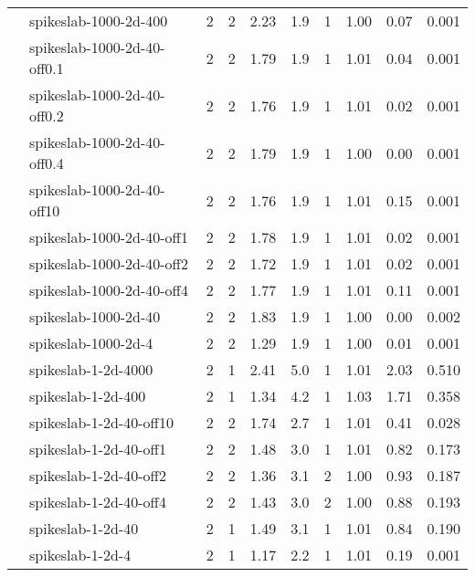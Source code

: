 \begin{tabular}{ll|rrcccccc}
                     & spikeslab-1000-2d-400 & 2   & 2    & 2.23 & 1.9 &    1 & 1.00 & 0.07 & 0.001 \\
                     & spikeslab-1000-2d-40-off0.1 & 2   & 2    & 1.79 & 1.9 &    1 & 1.01 & 0.04 & 0.001 \\
                     & spikeslab-1000-2d-40-off0.2 & 2   & 2    & 1.76 & 1.9 &    1 & 1.01 & 0.02 & 0.001 \\
                     & spikeslab-1000-2d-40-off0.4 & 2   & 2    & 1.79 & 1.9 &    1 & 1.00 & 0.00 & 0.001 \\
                     & spikeslab-1000-2d-40-off10 & 2   & 2    & 1.76 & 1.9 &    1 & 1.01 & 0.15 & 0.001 \\
                     & spikeslab-1000-2d-40-off1 & 2   & 2    & 1.78 & 1.9 &    1 & 1.01 & 0.02 & 0.001 \\
                     & spikeslab-1000-2d-40-off2 & 2   & 2    & 1.72 & 1.9 &    1 & 1.01 & 0.02 & 0.001 \\
                     & spikeslab-1000-2d-40-off4 & 2   & 2    & 1.77 & 1.9 &    1 & 1.01 & 0.11 & 0.001 \\
                     & spikeslab-1000-2d-40 & 2   & 2    & 1.83 & 1.9 &    1 & 1.00 & 0.00 & 0.002 \\
                     & spikeslab-1000-2d-4  & 2   & 2    & 1.29 & 1.9 &    1 & 1.00 & 0.01 & 0.001 \\
                     & spikeslab-1-2d-4000  & 2   & 1    & 2.41 & 5.0 &    1 & 1.01 & 2.03 & 0.510 \\
                     & spikeslab-1-2d-400   & 2   & 1    & 1.34 & 4.2 &    1 & 1.03 & 1.71 & 0.358 \\
                     & spikeslab-1-2d-40-off10 & 2   & 2    & 1.74 & 2.7 &    1 & 1.01 & 0.41 & 0.028 \\
                     & spikeslab-1-2d-40-off1 & 2   & 2    & 1.48 & 3.0 &    1 & 1.01 & 0.82 & 0.173 \\
                     & spikeslab-1-2d-40-off2 & 2   & 2    & 1.36 & 3.1 &    2 & 1.00 & 0.93 & 0.187 \\
                     & spikeslab-1-2d-40-off4 & 2   & 2    & 1.43 & 3.0 &    2 & 1.00 & 0.88 & 0.193 \\
                     & spikeslab-1-2d-40    & 2   & 1    & 1.49 & 3.1 &    1 & 1.01 & 0.84 & 0.190 \\
                     & spikeslab-1-2d-4     & 2   & 1    & 1.17 & 2.2 &    1 & 1.01 & 0.19 & 0.001 \\

\end{tabular}
